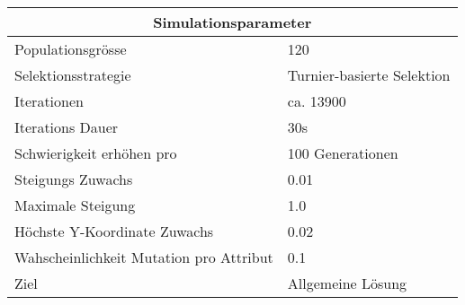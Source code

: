 
    \begin{tabular}{ | l | l | }
      \hline
      \multicolumn{2}{|c|}{Simulationsparameter} \\
      \hline
      Populationsgrösse & 120 \\ \hline
      Selektionsstrategie & Turnier-basierte Selektion \\ \hline
      Iterationen & ca. 13900 \\ \hline
      Iterations Dauer & 30s \\ \hline
      Schwierigkeit erhöhen pro & 100 Generationen \\ \hline
      Steigungs Zuwachs & 0.01 \\ \hline
      Maximale Steigung & 1.0 \\ \hline
      Höchste Y-Koordinate Zuwachs  & 0.02 \\ \hline
      Wahscheinlichkeit Mutation pro Attribut & 0.1 \\ \hline
      Ziel & Allgemeine Lösung \\ \hline
    \end{tabular}
